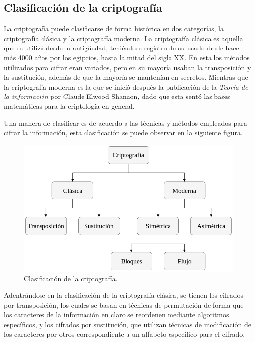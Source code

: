   \subsection{Clasificación de la criptografía}

    La criptografía puede clasificarse de forma histórica en dos categorías,
    la criptografía clásica y la criptografía moderna. La criptografía clásica
    es aquella que se utilizó desde la antigüedad, teniéndose registro de su
    usado desde hace más 4000 años por los egipcios, hasta la mitad del siglo
    XX. En esta los métodos utilizados para cifrar eran variados, pero en su
    mayoría usaban la transposición y la sustitución, además de que la mayoría
    se mantenían en secretos. Mientras que la criptografía moderna es la que
    se inició después la publicación de la \textit{Teoría de la información}
    por Claude Elwood Shannon, dado que esta sentó las bases matemáticas para
    la criptología en general.

    Una manera de clasificar es de acuerdo a las técnicas y métodos empleados
    para cifrar la información, esta clasificación se puede observar en la
    siguiente figura.

    \begin{figure}[H]
      \begin{center}
        \includegraphics[width=0.7\linewidth]
          {contenidos/antecedentes/intro_img/clasificacion_cripto.png}
        \caption{Clasificación de la criptografía.}
      \end{center}
    \end{figure}

    Adentrándose en la clasificación de la criptografía clásica, se tienen los 
    cifrados por transposición, los cuales se basan en técnicas de permutación 
    de forma que los caracteres de la información en claro se reordenen 
    mediante algoritmos específicos, y los cifrados por sustitución, que 
    utilizan técnicas de modificación de los caracteres por otros
    correspondiente a un alfabeto específico para el cifrado.

